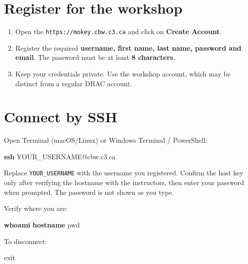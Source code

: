 \documentclass[
]{book}
\newenvironment{Shaded}{\begin{snugshade}}{\end{snugshade}}
\newcommand{\BuiltInTok}[1]{#1}
\newcommand{\FunctionTok}[1]{\textcolor[rgb]{0.13,0.29,0.53}{\textbf{#1}}}
\newcommand{\NormalTok}[1]{#1}
\providecommand{\tightlist}{%
  \setlength{\itemsep}{0pt}\setlength{\parskip}{0pt}}
\begin{document}
\section{Register for the workshop}\label{register-for-the-workshop}

\begin{enumerate}
\def\labelenumi{\arabic{enumi}.}
\tightlist
\item
  Open the \texttt{https://mokey.cbw.c3.ca} and click on \textbf{Create Account}.
\item
  Register the required \textbf{username, first name, last name, password and email}. The password must be at least \textbf{8 characters}.
\item
  Keep your credentials private. Use the workshop account, which may be distinct from a regular DRAC account.
\end{enumerate}

\section{Connect by SSH}\label{connect-by-ssh}

Open Terminal (macOS/Linux) or Windows Terminal / PowerShell:

\begin{Shaded}
\begin{Highlighting}[]
\FunctionTok{ssh}\NormalTok{ YOUR\_USERNAME@cbw.c3.ca}
\end{Highlighting}
\end{Shaded}

Replace \texttt{YOUR\_USERNAME} with the username you registered. Confirm the host key only after verifying the hostname with the instructors, then enter your password when prompted. The password is not shown as you type.

Verify where you are:

\begin{Shaded}
\begin{Highlighting}[]
\FunctionTok{whoami}
\FunctionTok{hostname}
\BuiltInTok{pwd}
\end{Highlighting}
\end{Shaded}

To disconnect:

\begin{Shaded}
\begin{Highlighting}[]
\BuiltInTok{exit}
\end{Highlighting}
\end{Shaded}
\end{document}
